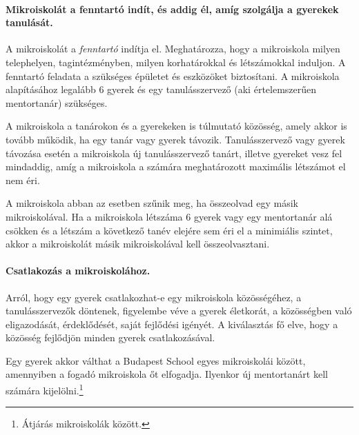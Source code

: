 \paragraph{Mikroiskolát a fenntartó indít, és addig él, amíg szolgálja a
      gyerekek tanulását.}
A mikroiskolát a \emph{fenntartó} indítja el. Meghatározza, hogy a mikroiskola milyen telephelyen,
tagintézményben, milyen korhatárokkal és létszámokkal
induljon. A fenntartó feladata a szükséges épületet és eszközöket
biztosítani. A
mikroiskola alapításához legalább 6 gyerek és egy tanulásszervező (aki
értelemszerűen mentortanár)
szükséges.

A mikroiskola a tanárokon és a gyerekeken is túlmutató közösség, amely akkor is
tovább működik, ha egy tanár vagy gyerek távozik. Tanulásszervező vagy
gyerek távozása esetén a mikroiskola  új tanulásszervező tanárt, illetve gyereket
vesz fel mindaddig, amíg a mikroiskola a számára meghatározott maximális
létszámot el nem éri.

A mikroiskola abban az esetben szűnik meg, ha összeolvad egy másik
mikroiskolával. Ha a mikroiskola létszáma 6 gyerek vagy egy mentortanár alá csökken és
a létszám a következő tanév elejére sem éri el a minimiális szintet, akkor a mikroiskolát másik
mikroiskolával kell összeolvasztani.

\paragraph{Csatlakozás a mikroiskolához.}
Arról, hogy egy gyerek csatlakozhat-e egy mikroiskola közösségéhez, a
tanulásszervezők
döntenek, figyelembe véve a gyerek életkorát, a közösségben való
eligazodását, érdeklődését, saját fejlődési igényét. A kiválasztás fő elve, 
hogy a közösség fejlődjön minden gyerek csatlakozásával.


Egy gyerek akkor válthat a Budapest School egyes mikroiskolái között,
amennyiben a fogadó mikroiskola őt elfogadja. Ilyenkor új mentortanárt kell
számára kijelölni.\footnote{Átjárás mikroiskolák között.}
